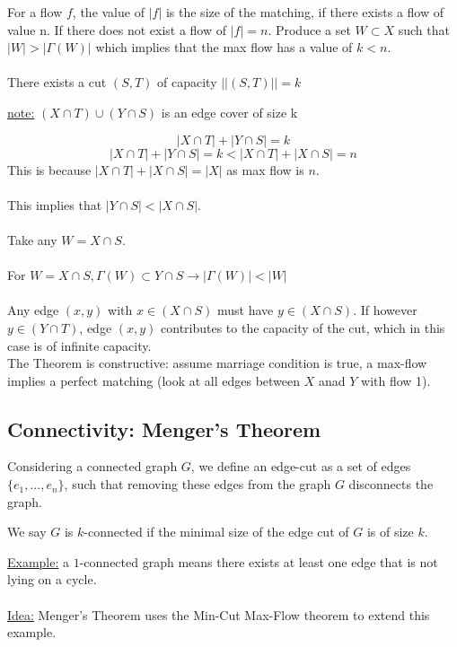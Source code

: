 \documentclass[12pt]{article}
\begin{document}
For a flow $f$, the value of $|f|$ is the size of the matching, if there exists a flow of value n. If there does not exist a flow of $|f|=n$. Produce a set $W \subset X$ such that $|W| > |\Gamma (W)|$ which implies that the max flow has a value of $k < n$.\\
\\
There exists a cut $(S,T)$ of capacity $||(S,T)||=k$
\begin{tcolorbox}
	\underline{note:} $(X\cap T) \cup (Y \cap S)$ is an edge cover of size k
\end{tcolorbox}
$$|X \cap T| + |Y \cap S| = k$$
$$|X \cap T| + |Y \cap S| = k < |X \cap T| + |X \cap S| = n$$
This is because $ |X \cap T| + |X \cap S| = |X|$ as max flow is $n$.\\
\\
This implies that $|Y\cap S| < |X \cap S|$.\\
\\
Take any $W = X \cap S$.\\
\\
For $W=X \cap S, \Gamma (W) \subset Y \cap S \longrightarrow |\Gamma (W)| < |W|$\\
\\
Any edge $(x,y)$ with $x \in (X \cap S)$ must have $y\in (X \cap S)$. If however $y \in (Y \cap T)$, edge $(x,y)$ contributes to the capacity of the cut, which in this case is of infinite capacity.\\
The Theorem is constructive: assume marriage condition is true, a max-flow implies a perfect matching (look at all edges between $X$ anad $Y$ with flow 1).

\subsection{Connectivity: Menger's Theorem}

\begin{tcolorbox}[title=Definition: edge-cut]
	Considering a connected graph $G$, we define an edge-cut as a set of edges $\{ e_1, ..., e_n \}$, such that removing these edges from the graph $G$ disconnects the graph.
\end{tcolorbox}

\begin{tcolorbox}[title=Definition: $k$-connected]
	We say $G$ is $k$-connected if the minimal size of the edge cut of $G$ is of size $k$.
\end{tcolorbox}

\underline{Example:} a $1$-connected graph means there exists at least one edge that is not lying on a cycle.\\
\\
\underline{Idea:} Menger's Theorem uses the Min-Cut Max-Flow theorem to extend this example.
\end{document}
